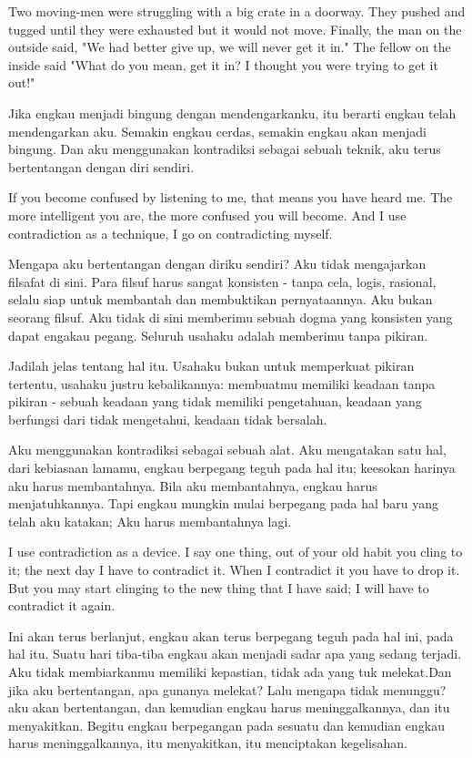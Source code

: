\english
Two moving-men were struggling with a big crate in a doorway. They pushed and tugged until they were exhausted but it would not move. Finally, the man on the outside said, "We had better give up, we will never get it in." The fellow on the inside said "What do you mean, get it in? I thought you were trying to get it out!"

\bahasa
Jika engkau menjadi bingung dengan mendengarkanku, itu berarti engkau telah mendengarkan aku. Semakin engkau cerdas, semakin engkau akan menjadi bingung. Dan aku menggunakan kontradiksi sebagai sebuah teknik, aku terus bertentangan dengan diri sendiri.

\english
If you become confused by listening to me, that means you have heard me. The more intelligent you are, the more confused you will become. And I use contradiction as a technique, I go on contradicting myself.

\bahasa
Mengapa aku bertentangan dengan diriku sendiri? Aku tidak mengajarkan filsafat di sini. Para filsuf harus sangat konsisten - tanpa cela, logis, rasional, selalu siap untuk membantah dan membuktikan pernyataannya. Aku bukan seorang filsuf. Aku tidak di sini memberimu sebuah dogma yang konsisten yang dapat engakau pegang. Seluruh usahaku adalah memberimu tanpa pikiran.

\english
Jadilah jelas tentang hal itu. Usahaku bukan untuk memperkuat pikiran tertentu, usahaku justru kebalikannya: membuatmu memiliki keadaan tanpa pikiran - sebuah keadaan yang tidak memiliki pengetahuan, keadaan yang berfungsi dari tidak mengetahui, keadaan tidak bersalah.

\bahasa
Aku menggunakan kontradiksi sebagai sebuah alat. Aku mengatakan satu hal, dari kebiasaan lamamu, engkau berpegang teguh pada hal itu; keesokan harinya aku harus membantahnya. Bila aku membantahnya, engkau harus menjatuhkannya. Tapi engkau mungkin mulai berpegang pada hal baru yang telah aku katakan; Aku harus membantahnya lagi.

\english
I use contradiction as a device. I say one thing, out of your old habit you cling to it; the next day I have to contradict it. When I contradict it you have to drop it. But you may start clinging to the new thing that I have said; I will have to contradict it again.

\bahasa
Ini akan terus berlanjut, engkau akan terus berpegang teguh pada hal ini, pada hal itu. Suatu hari tiba-tiba engkau akan menjadi sadar apa yang sedang terjadi. Aku tidak membiarkanmu memiliki kepastian, tidak ada yang tuk melekat.Dan jika aku bertentangan, apa gunanya melekat? Lalu mengapa tidak menunggu? aku akan bertentangan, dan kemudian engkau harus meninggalkannya, dan itu menyakitkan. Begitu engkau berpegangan pada sesuatu dan kemudian engkau harus meninggalkannya, itu menyakitkan, itu menciptakan kegelisahan.

